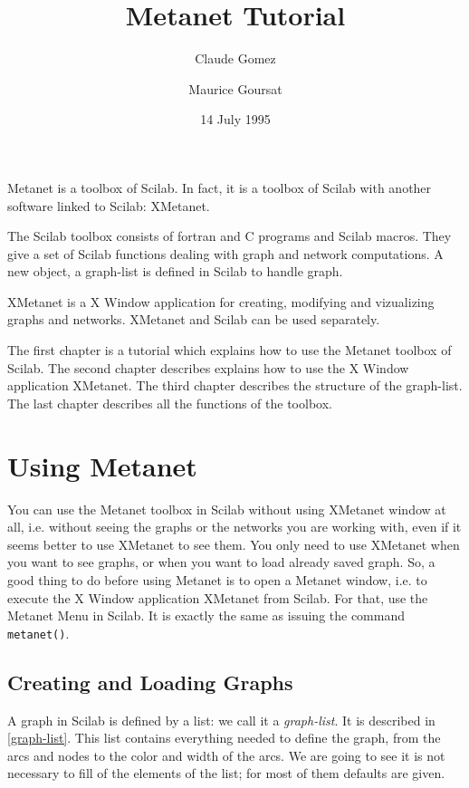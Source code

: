 \documentclass[11pt]{report}
\title{Metanet Tutorial}
\author{Claude Gomez \and Maurice Goursat}
\date{14 July 1995}
\newcommand{\T}[1]{{\tt #1}}
\begin{document}
\maketitle

Metanet is a toolbox of Scilab. In fact, it is a toolbox of Scilab
with another software linked to Scilab: XMetanet.

The Scilab toolbox consists of fortran and C programs and Scilab
macros.  
They give a set of Scilab functions dealing with graph and
network computations. A new object, a graph-list is defined in Scilab to handle
graph.

XMetanet is a X Window application for creating, modifying and
vizualizing graphs and networks. XMetanet and Scilab can be
used separately. 

 The first chapter is a tutorial which explains
how to use the Metanet toolbox of Scilab.
 The second chapter describes explains how to use the X
Window application XMetanet.
 The third chapter describes the structure of the
graph-list.
 The last chapter describes all the functions
of the toolbox.

\chapter{Using Metanet}

You can use the Metanet toolbox in Scilab without using XMetanet window at
all,
\mbox{i.e.} without seeing the graphs or the networks you are working with,
even if it seems better to use XMetanet to see them. You only need to use 
XMetanet when you want to see graphs, or when you want to load already 
saved graph.
So, a good thing to do before using Metanet
is to open a Metanet window, \mbox{i.e.} to execute the X Window application
XMetanet from Scilab. For that, use the Metanet Menu in
Scilab. It is exactly the same as issuing the command \T{metanet()}.

\section{Creating and Loading Graphs}

A graph in Scilab is defined by a list: we call it a
{\em graph-list}. It  
is described in \ref{graph-list}. This list contains everything needed to
define the graph, from the arcs and nodes to the color and width of the
arcs. We are going to see it is not necessary to fill of the elements of
the list; for most of them defaults are given.
\end{document}
